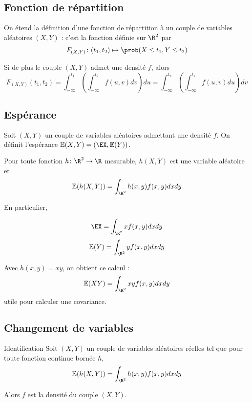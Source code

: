 		
		\subsection{Fonction de répartition}
		
		On étend la définition d'une fonction de répartition à un couple de variables aléatoires $(X,Y)$ : c'est la fonction définie sur $\R^2$ par 
		$$F_{(X,Y)} \colon (t_1,t_2) \mapsto \prob(X \leq t_1, Y \leq t_2)$$
		
		Si de plus le couple $(X,Y)$ admet une densité $f$, alors 
		$$F_{(X,Y)}(t_1,t_2) = \int_{-\infty}^{t_1} \left( \int_{-\infty}^{t_2} f(u,v)dv \right) du =  \int_{-\infty}^{t_2} \left( \int_{-\infty}^{t_1} f(u,v)du \right) dv$$
		
		\subsection{Espérance}
		
		\begin{definition}{}{}
			Soit $(X,Y)$ un couple de variables aléatoires admettant une densité $f$. On définit l'espérance $\mathbb{E}(X,Y)=(\EX, \mathbb{E}(Y))$.
			
			Pour toute fonction $h \colon \R^2 \to \R $ mesurable, $h(X,Y)$ est une variable aléatoire et
			$$\mathbb{E}(h(X,Y)) =   \int_{\R^2} h(x,y) f(x,y)dxdy$$
			
			En particulier, 
			
			$$\EX = \int_{\R^2} x f(x,y)dxdy$$
			$$\mathbb{E}(Y) = \int_{\R^2} y f(x,y)dxdy$$
			
			
		\end{definition}
		
		\begin{exemple}{}{}
			Avec $h(x,y)=xy$, on obtient ce calcul :
			$$\mathbb{E}(XY) = \int_{\R^2} xy f(x,y)dxdy$$
			utile pour calculer une covariance.
		\end{exemple}
		
		\subsection{Changement de variables}
		\begin{theoreme}{Identification}{}
			Soit $(X,Y)$ un couple de variables aléatoires réelles tel que pour toute fonction continue bornée $h$,  
			$$\mathbb{E}(h(X,Y))=\int_{\R^2}^{}h(x,y)f(x,y)dxdy$$
			
			Alors $f$ est la densité du couple $(X,Y)$.
		\end{theoreme}
		

